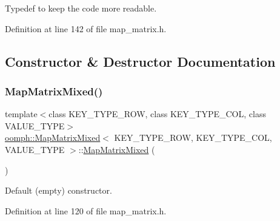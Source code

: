 Typedef to keep the code more readable. 



Definition at line 142 of file map\+\_\+matrix.\+h.



\subsection{Constructor \& Destructor Documentation}
\mbox{\label{classoomph_1_1MapMatrixMixed_a51d284e72805320fe36239f5d33e2973}} 
\subsubsection{\texorpdfstring{Map\+Matrix\+Mixed()}{MapMatrixMixed()}\hspace{0.1cm}{\footnotesize\ttfamily [1/2]}}
{\footnotesize\ttfamily template$<$class K\+E\+Y\+\_\+\+T\+Y\+P\+E\+\_\+\+R\+OW, class K\+E\+Y\+\_\+\+T\+Y\+P\+E\+\_\+\+C\+OL, class V\+A\+L\+U\+E\+\_\+\+T\+Y\+PE$>$ \\
\hyperlink{classoomph_1_1MapMatrixMixed}{oomph\+::\+Map\+Matrix\+Mixed}$<$ K\+E\+Y\+\_\+\+T\+Y\+P\+E\+\_\+\+R\+OW, K\+E\+Y\+\_\+\+T\+Y\+P\+E\+\_\+\+C\+OL, V\+A\+L\+U\+E\+\_\+\+T\+Y\+PE $>$\+::\hyperlink{classoomph_1_1MapMatrixMixed}{Map\+Matrix\+Mixed} (\begin{DoxyParamCaption}{ }\end{DoxyParamCaption})\hspace{0.3cm}{\ttfamily [inline]}}



Default (empty) constructor. 



Definition at line 120 of file map\+\_\+matrix.\+h.

\mbox{\label{classoomph_1_1MapMatrixMixed_ae510212b296340607ddce4083b3ed36a}} 
